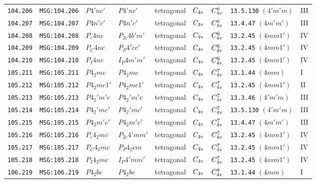 \documentclass[fleqn,10pt]{jsarticle}
\begin{document}
\begin{center}
\begin{longtable}{lllllllll}
\texttt{104.206} & \texttt{MSG:104.206} & $P4'nc'$ & $P4'nc'$ & tetragonal & $C_{\rm 4v}$ & $C_{\rm 4v}^{6}$ & \texttt{13.5.130} $(4'm'm)$ & III \\
\texttt{104.207} & \texttt{MSG:104.207} & $P4n'c'$ & $P4n'c'$ & tetragonal & $C_{\rm 4v}$ & $C_{\rm 4v}^{6}$ & \texttt{13.4.47} $(4m'm')$ & III \\
\texttt{104.208} & \texttt{MSG:104.208} & $P_{c}4nc$ & $P_{2c}4b'm'$ & tetragonal & $C_{\rm 4v}$ & $C_{\rm 4v}^{6}$ & \texttt{13.2.45} $(4mm1')$ & IV \\
\texttt{104.209} & \texttt{MSG:104.209} & $P_{C}4nc$ & $P_{P}4'cc'$ & tetragonal & $C_{\rm 4v}$ & $C_{\rm 4v}^{6}$ & \texttt{13.2.45} $(4mm1')$ & IV \\
\texttt{104.210} & \texttt{MSG:104.210} & $P_{I}4nc$ & $I_{P}4m'm'$ & tetragonal & $C_{\rm 4v}$ & $C_{\rm 4v}^{6}$ & \texttt{13.2.45} $(4mm1')$ & IV \\ \hline
\texttt{105.211} & \texttt{MSG:105.211} & $P4_{2}mc$ & $P4_{2}mc$ & tetragonal & $C_{\rm 4v}$ & $C_{\rm 4v}^{7}$ & \texttt{13.1.44} $(4mm)$ & I \\
\texttt{105.212} & \texttt{MSG:105.212} & $P4_{2}mc1'$ & $P4_{2}mc1'$ & tetragonal & $C_{\rm 4v}$ & $C_{\rm 4v}^{7}$ & \texttt{13.2.45} $(4mm1')$ & II \\
\texttt{105.213} & \texttt{MSG:105.213} & $P4_{2}'m'c$ & $P4_{2}'m'c$ & tetragonal & $C_{\rm 4v}$ & $C_{\rm 4v}^{7}$ & \texttt{13.3.46} $(4'm'm)$ & III \\
\texttt{105.214} & \texttt{MSG:105.214} & $P4_{2}'mc'$ & $P4_{2}'mc'$ & tetragonal & $C_{\rm 4v}$ & $C_{\rm 4v}^{7}$ & \texttt{13.5.130} $(4'm'm)$ & III \\
\texttt{105.215} & \texttt{MSG:105.215} & $P4_{2}m'c'$ & $P4_{2}m'c'$ & tetragonal & $C_{\rm 4v}$ & $C_{\rm 4v}^{7}$ & \texttt{13.4.47} $(4m'm')$ & III \\
\texttt{105.216} & \texttt{MSG:105.216} & $P_{c}4_{2}mc$ & $P_{2c}4'mm'$ & tetragonal & $C_{\rm 4v}$ & $C_{\rm 4v}^{7}$ & \texttt{13.2.45} $(4mm1')$ & IV \\
\texttt{105.217} & \texttt{MSG:105.217} & $P_{C}4_{2}mc$ & $P_{P}4_{2}cm$ & tetragonal & $C_{\rm 4v}$ & $C_{\rm 4v}^{7}$ & \texttt{13.2.45} $(4mm1')$ & IV \\
\texttt{105.218} & \texttt{MSG:105.218} & $P_{I}4_{2}mc$ & $I_{P}4'mm'$ & tetragonal & $C_{\rm 4v}$ & $C_{\rm 4v}^{7}$ & \texttt{13.2.45} $(4mm1')$ & IV \\ \hline
\texttt{106.219} & \texttt{MSG:106.219} & $P4_{2}bc$ & $P4_{2}bc$ & tetragonal & $C_{\rm 4v}$ & $C_{\rm 4v}^{8}$ & \texttt{13.1.44} $(4mm)$ & I \\

\end{longtable}
\end{center}
\end{document}
